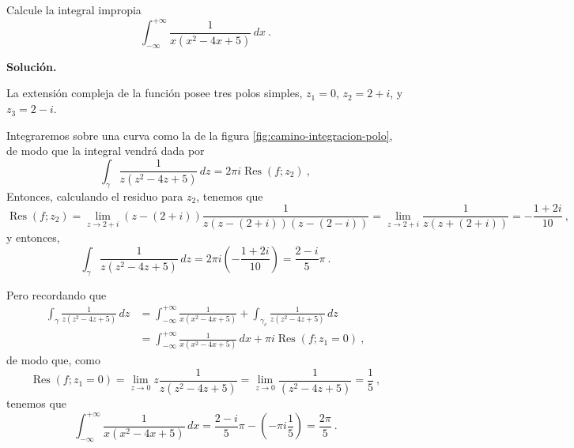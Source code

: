 \begin{ejemplo}
    Calcule la integral impropia
    \begin{equation*}
        \int_{-\infty}^{+\infty} \frac{1}{x(x^2-4x+5)} \, dx \ . 
    \end{equation*}

    \noindent \textbf{Solución.}

    La extensión compleja de la función posee tres polos simples, $z_1 = 0$, $z_2 = 2+i$, y $z_3 = 2-i$.

    Integraremos sobre una curva como la de la figura \ref{fig:camino-integracion-polo}, de modo que la integral vendrá dada por 
    \begin{equation*}
        \int_{\gamma} \frac{1}{z(z^2-4z+5)} \, dz = 2\pi i \operatorname{Res}(f; z_2) \ ,
    \end{equation*}
    Entonces, calculando el residuo para $z_2$, tenemos que
    \begin{equation*}
        \operatorname{Res}(f; z_2) = \lim_{z \to 2+i} (z - (2+i)) \frac{1}{z(z-(2+i)) (z-(2-i))} = \lim_{z \to 2+i} \frac{1}{z(z+(2+i))} = - \frac{1+2i}{10} \ ,
    \end{equation*}
    y entonces,
    \begin{equation*}
        \int_{\gamma} \frac{1}{z(z^2-4z+5)} \, dz = 2\pi i \left( - \frac{1+2i}{10} \right) = \frac{2-i}{5} \pi \ .
    \end{equation*}

    Pero recordando que 
    \begin{align*}
        \int_{\gamma} \frac{1}{z(z^2-4z+5)} \, dz & = \int_{-\infty}^{+\infty} \frac{1}{x(x^2-4x+5)} + \int_{\gamma_c} \frac{1}{z(z^2-4z+5)} \, dz \\
        & = \int_{-\infty}^{+\infty} \frac{1}{x(x^2-4x+5)} \, dx + \pi i \operatorname{Res}(f; z_1 = 0) \ ,
    \end{align*}
    de modo que, como 
    \begin{equation*}
        \operatorname{Res}(f; z_1 = 0) = \lim_{z \to 0} z \frac{1}{z(z^2-4z+5)} = \lim_{z \to 0} \frac{1}{(z^2-4z+5)} = \frac{1}{5} \ ,
    \end{equation*}
    tenemos que
    \begin{equation*}
        \int_{-\infty}^{+\infty} \frac{1}{x(x^2-4x+5)} \, dx = \frac{2-i}{5} \pi - \left( - \pi i \frac{1}{5}\right) = \frac{2\pi}{5} \ .
    \end{equation*}
\end{ejemplo}
